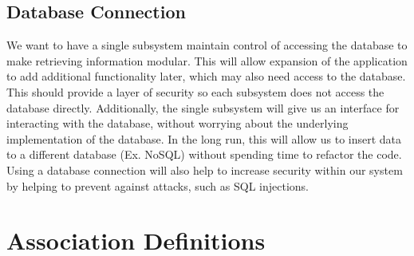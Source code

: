 \subsection{Database Connection}
We want to have a single subsystem maintain control of accessing the database to make retrieving information modular. This will allow expansion of the application to add additional functionality later, which may also need access to the database. This should provide a layer of security so each subsystem does not access the database directly. Additionally, the single subsystem will give us an interface for interacting with the database, without worrying about the underlying implementation of the database. In the long run, this will allow us to insert data to a different database (Ex. NoSQL) without spending time to refactor the code. Using a database connection will also help to increase security within our system by helping to prevent against attacks, such as SQL injections.\\

\newpage
\section{Association Definitions}

